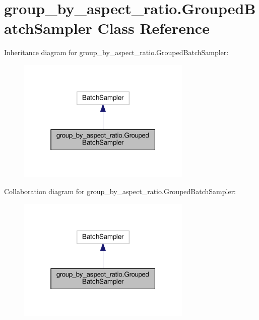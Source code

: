 \hypertarget{classgroup__by__aspect__ratio_1_1GroupedBatchSampler}{}\section{group\+\_\+by\+\_\+aspect\+\_\+ratio.\+Grouped\+Batch\+Sampler Class Reference}
\label{classgroup__by__aspect__ratio_1_1GroupedBatchSampler}


Inheritance diagram for group\+\_\+by\+\_\+aspect\+\_\+ratio.\+Grouped\+Batch\+Sampler\+:
\nopagebreak
\begin{figure}[H]
\begin{center}
\leavevmode
\includegraphics[width=235pt]{classgroup__by__aspect__ratio_1_1GroupedBatchSampler__inherit__graph}
\end{center}
\end{figure}


Collaboration diagram for group\+\_\+by\+\_\+aspect\+\_\+ratio.\+Grouped\+Batch\+Sampler\+:
\nopagebreak
\begin{figure}[H]
\begin{center}
\leavevmode
\includegraphics[width=235pt]{classgroup__by__aspect__ratio_1_1GroupedBatchSampler__coll__graph}
\end{center}
\end{figure}

